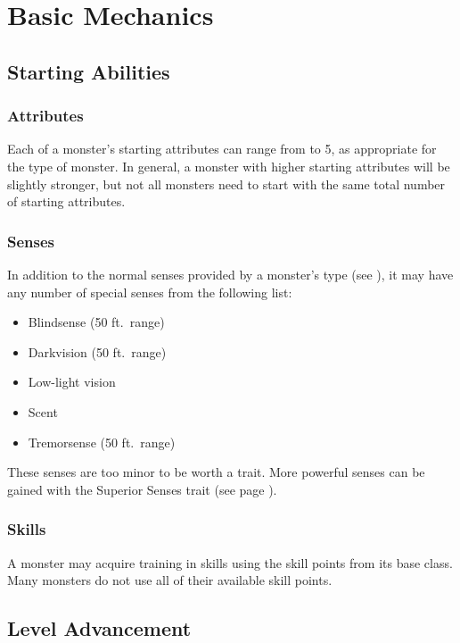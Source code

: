\chapter{Basic Mechanics}

\section{Starting Abilities}

    \subsection{Attributes}
    Each of a monster's starting attributes can range from  to 5, as appropriate for the type of monster.
    In general, a monster with higher starting attributes will be slightly stronger, but not all monsters need to start with the same total number of starting attributes.

    \subsection{Senses}
        In addition to the normal senses provided by a monster's type (see ), it may have any number of special senses from the following list:
        \begin{itemize}
            \item Blindsense (50 ft.\ range)
            \item Darkvision (50 ft.\ range)
            \item Low-light vision
            \item Scent
            \item Tremorsense (50 ft.\ range)
        \end{itemize}

        These senses are too minor to be worth a trait.
        More powerful senses can be gained with the Superior Senses trait (see page ).

    \subsection{Skills}
        A monster may acquire training in skills using the skill points from its base class.
        Many monsters do not use all of their available skill points.

\section{Level Advancement}\label{Level Advancement}


